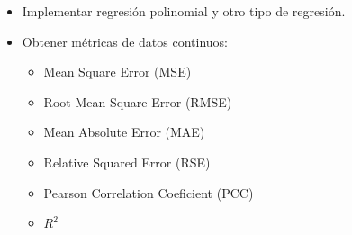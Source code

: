 \begin{itemize}
	\item Implementar regresión polinomial y otro tipo de regresión.
	\item Obtener métricas de datos continuos:
	\begin{itemize}
		\item Mean Square Error (MSE)
		\item Root Mean Square Error (RMSE)
		\item Mean Absolute Error (MAE)
		\item Relative Squared Error (RSE)
		\item Pearson Correlation Coeficient (PCC)
		\item $R^2$
	\end{itemize}
\end{itemize}
